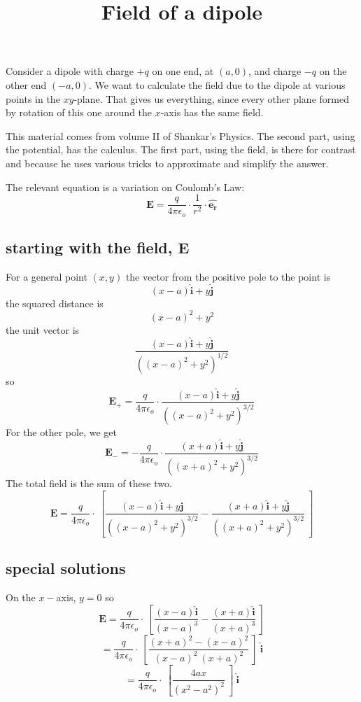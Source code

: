 \documentclass[11pt, oneside]{article}
\title{Field of a dipole}
\date{}
\begin{document}
\maketitle
\Large
Consider a dipole with charge $+q$ on one end, at $(a,0)$, and charge $-q$ on the other end $(-a,0)$.  We want to calculate the field due to the dipole at various points in the $xy$-plane.  That gives us everything, since every other plane formed by rotation of this one around the $x$-axis has the same field.  

This material comes from volume II of Shankar's Physics.  The second part, using the potential, has the calculus.  The first part, using the field, is there for contrast and because he uses various tricks to approximate and simplify the answer.

The relevant equation is a variation on Coulomb's Law:
\[ \mathbf{E} = \frac{q}{4 \pi \epsilon_o} \cdot \frac{1}{r^2} \cdot \hat{\mathbf{e_r}} \]

\subsection*{starting with the field, E}

For a general point $(x,y)$ the vector from the positive pole to the point is
\[ (x - a) \hat{\mathbf{i}} + y \hat{\mathbf{j}} \]
the squared distance is
\[ (x - a)^2 + y^2 \]
the unit vector is
\[ \frac{(x - a) \hat{\mathbf{i}} + y \hat{\mathbf{j}}}{((x - a)^2 + y^2)^{1/2}} \]
so
\[ \mathbf{E}_+ = \frac{q}{4 \pi \epsilon_o} \cdot  \frac{ (x - a) \hat{\mathbf{i}} + y \hat{\mathbf{j}} }{((x - a)^2 + y^2)^{3/2}} \]
For the other pole, we get
\[ \mathbf{E}_- = - \frac{q}{4 \pi \epsilon_o} \cdot  \frac{(x + a) \hat{\mathbf{i}} + y \hat{\mathbf{j}}}{((x + a)^2 + y^2)^{3/2}} \]
The total field is the sum of these two.
\[ \mathbf{E} = \frac{q}{4 \pi \epsilon_o} \cdot \ [ \frac{(x - a) \hat{\mathbf{i}} + y \hat{\mathbf{j}} }{((x - a)^2 + y^2)^{3/2}} - \frac{(x + a) \hat{\mathbf{i}} + y \hat{\mathbf{j}} }{((x + a)^2 + y^2)^{3/2}} \ ] \]

\subsection*{special solutions}
On the $x-$axis, $y = 0$ so 
\[ \mathbf{E} = \frac{q}{4 \pi \epsilon_o} \cdot \ [ \frac{(x - a) \hat{\mathbf{i}}  }{(x - a)^3} - \frac{(x + a) \hat{\mathbf{i}} }{(x + a)^3} \ ] \]
\[ = \frac{q}{4 \pi \epsilon_o} \cdot \ [ \frac{(x + a)^2 - (x - a)^2}{(x - a)^2 \ (x + a)^2} \ ] \ \hat{\mathbf{i}} \]
\[ = \frac{q}{4 \pi \epsilon_o} \cdot \ [ \frac{4ax}{(x^2 - a^2)^2} \ ] \ \hat{\mathbf{i}} \]
\end{document}
